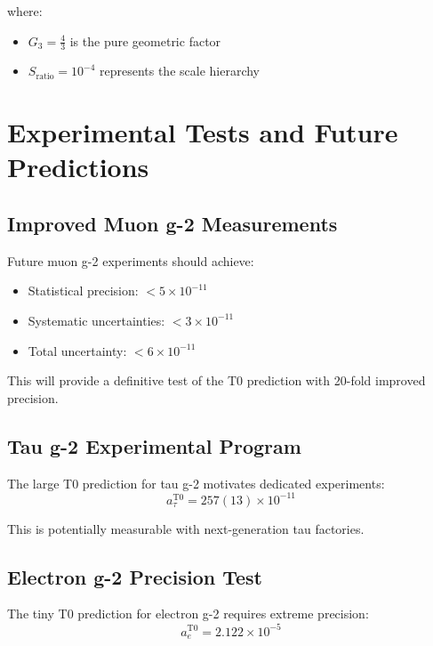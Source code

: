\documentclass[12pt,a4paper]{report}
\begin{document}
where:
\begin{itemize}
	\item $G_3 = \frac{4}{3}$ is the pure geometric factor
	\item $S_{\text{ratio}} = 10^{-4}$ represents the scale hierarchy
\end{itemize}

\section{Experimental Tests and Future Predictions}
\label{sec:experimental_tests}

\subsection{Improved Muon g-2 Measurements}
\label{subsec:improved_muon_measurements}

Future muon g-2 experiments should achieve:
\begin{itemize}
	\item Statistical precision: $< 5 \times 10^{-11}$
	\item Systematic uncertainties: $< 3 \times 10^{-11}$
	\item Total uncertainty: $< 6 \times 10^{-11}$
\end{itemize}

This will provide a definitive test of the T0 prediction with 20-fold improved precision.

\subsection{Tau g-2 Experimental Program}
\label{subsec:tau_g2_program}

The large T0 prediction for tau g-2 motivates dedicated experiments:
\begin{equation}
	a_\tau^{\text{T0}} = 257(13) \times 10^{-11}
	\label{eq:tau_prediction}
\end{equation}

This is potentially measurable with next-generation tau factories.

\subsection{Electron g-2 Precision Test}
\label{subsec:electron_g2_precision}

The tiny T0 prediction for electron g-2 requires extreme precision:
\begin{equation}
	a_e^{\text{T0}} = 2.122 \times 10^{-5}
	\label{eq:electron_prediction}
\end{equation}
\end{document}
